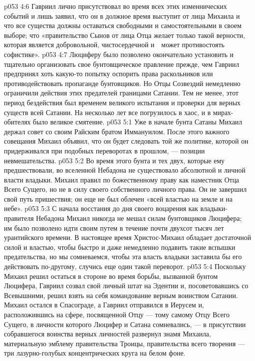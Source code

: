 \vs p053 4:6 Гавриил лично присутствовал во время всех этих изменнических событий и лишь заявил, что он в должное время выступит от лица Михаила и что все существа должны оставаться свободными и самостоятельными в своем выборе; что «правительство Сынов от лица Отца желает только такой верности, которая является добровольной, чистосердечной и　может противостоять софистике».
\vs p053 4:7 \pc Люциферу было позволено окончательно установить и тщательно организовать свое бунтовщическое правление прежде, чем Гавриил предпринял хоть какую\hyp{}то попытку оспорить права раскольников или противодействовать пропаганде бунтовщиков. Но Отцы Созвездий немедленно ограничили действия этих предателей границами Сатании. Тем не менее, этот период бездействия был временем великого испытания и проверки для верных существ всей Сатании. На несколько лет все погрузилось в хаос, и в мирах\hyp{}обителях было великое смятение.
\vs p053 5:1 Уже в начале бунта Сатаны Михаил держал совет со своим Райским братом Иммануилом. После этого важного совещания Михаил объявил, что он будет следовать той же политике, которой он придерживался при подобных переворотах в прошлом, --- позиции невмешательства.
\vs p053 5:2 \pc Во время этого бунта и тех двух, которые ему предшествовали, во вселенной Небадона не существовало абсолютной и личной власти владыки. Михаил правил по божественному праву как наместник Отца Всего Сущего, но не в силу своего собственного личного права. Он не завершил свой путь пришествия; он еще не был облечен «всей властью на земле и на небе».
\vs p053 5:3 С начала восстания до дня своего воцарения как владыки\hyp{}правителя Небадона Михаил никогда не мешал силам бунтовщиков Люцифера; им было позволено идти своим путем в течение почти двухсот тысяч лет урантийского времени. В настоящее время Христос\hyp{}Михаил обладает достаточной силой и властью, чтобы быстро и даже немедленно подавить такие вспышки предательства, но мы сомневаемся, чтобы эта власть владыки заставила бы его действовать по\hyp{}другому, случись еще один такой переворот.
\vs p053 5:4 \pc Поскольку Михаил решил остаться в стороне во время борьбы, вызванной бунтом Люцифера, Гавриил созвал свой личный штат на Эдентии и, посоветовавшись со Всевышними, решил взять на себя командование верным воинством Сатании. Михаил остался в Спасограде, а Гавриил отправился в Иерусем и, расположившись на сфере, посвященной Отцу --- тому самому Отцу Всего Сущего, в личности которого Люцифер и Сатана сомневались, --- в присутствии собравшегося воинства верных личностей развернул знамя Михаила, материальную эмблему правительства Троицы, правительства всего творения --- три лазурно\hyp{}голубых концентрических круга на белом фоне.
